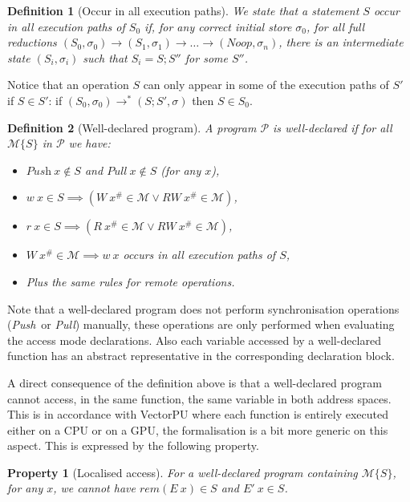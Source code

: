 \documentclass[preprint,12pt]{elsarticle}
\newcommand{\symb}[1]{\textit{#1}}
\newcommand{\noop}{\symb{Noop}}
\newcommand{\Push}{\symb{Push}}
\newcommand{\Pull}{\symb{Pull}}
\newcommand{\rem}[1]{\symb{rem}(#1)}
\newtheorem{definition}{Definition}
\newtheorem{Property}{Property}
\newcommand{\abs}[1]{#1^\#}
\newcommand{\AM}{\mathcal{M}}
\newcommand{\Prog}{\mathcal{P}}
\begin{document}
\begin{definition}[Occur in all execution paths]
We state that a statement\emph{ $S$ occur in all execution paths of $S_0$} if, for any 
correct 
initial store $\sigma_0$, for all full reductions 
$(S_0,\sigma_0)\to(S_1,\sigma_1)\to\ldots\to(\noop,\sigma_n)$, there is an intermediate 
state $(S_i,\sigma_i)$ such that $S_i=S;S''$ for some $S''$.
\end{definition}
Notice that an operation $S$ can only appear in some of the execution paths of $S'$ if  $S\in 
S'$: if $(S_0,\sigma_0)\to^* (S;S',\sigma)$ then $S\in S_0$.


\begin{definition}[Well-declared program]\label{def-WD}
A program $\Prog$ is \emph{well-declared} if for all $\AM\{S\}$ in $\Prog$ we have:
\begin{itemize}
\item $\Push\ x\not\in S$ and $\Pull\ x\not \in S$ (for any $x$),
\item $w\ x\in S \implies (W\ \abs x \in \AM \lor RW\ \abs x \in \AM)$,
\item $r\ x\in S \implies (R\ \abs x \in \AM \lor RW\ \abs x \in \AM)$,
\item $W\ \abs x\!\in\! \AM \!\implies\! w\ x$ occurs in all execution paths of $S$,
\item Plus the same rules for remote operations.
\end{itemize}
\end{definition}
Note that a well-declared program does not perform synchronisation 
operations (\Push\ or \Pull) manually, these operations are only  performed when 
evaluating the 
access mode declarations. Also each variable accessed by a well-declared function has an 
abstract representative in the corresponding declaration block.


A direct consequence of the definition above is that a well-declared program cannot 
access, in the same function, the same
variable in both address spaces. This is in accordance with VectorPU where each function 
is entirely executed either on a CPU or on a GPU, the formalisation is a bit more 
 generic on this aspect. This is expressed by the following property.
\begin{Property}[Localised access]\label{prop-localised}
For a well-declared program containing $\AM\{S\}$, for any $x$, we cannot have $\rem {E\ 
x} \in S$ and $E'\ x \in S$.
\end{Property}

\smallskip
\end{document}
